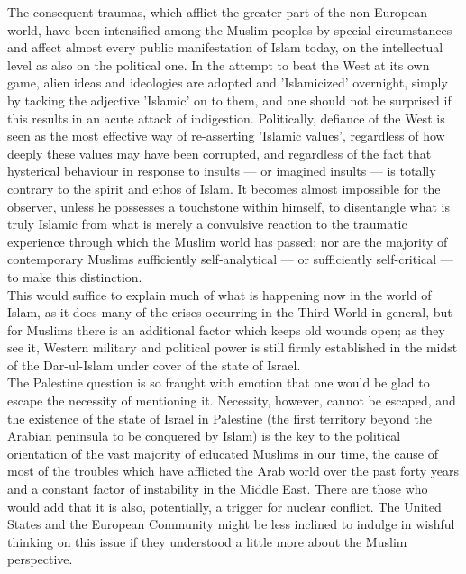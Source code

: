 \documentclass[10pt, twoside,openright]{book}
\begin{document}
The consequent traumas, which afflict the greater part of the non\hyp{}European world, have been intensified among the Muslim peoples by special circumstances and affect almost every public manifestation of Islam today, on the intellectual level as also on the political one. In the attempt to beat the West at its own game, alien ideas and ideologies are adopted and 'Islamicized' overnight, simply by tacking the adjective 'Islamic' on to them, and one should not be surprised if this results in an acute attack of indigestion. Politically, defiance of the West is seen as the most effective way of re-asserting 'Islamic values', regardless of how deeply these values may have been corrupted, and regardless of the fact that hysterical behaviour in response to insults --- or imagined insults --- is totally contrary to the spirit and ethos of Islam. It becomes almost impossible for the observer, unless he possesses a touchstone within himself, to disentangle what is truly Islamic from what is merely a convulsive reaction to the traumatic experience through which the Muslim world has passed; nor are the majority of contemporary Muslims sufficiently self\hyp{}analytical --- or sufficiently self\hyp{}critical --- to make this distinction. \\

This would suffice to explain much of what is happening now in the world of Islam, as it does many of the crises occurring in the Third World in general, but for Muslims there is an additional factor which keeps old wounds open; as they see it, Western military and political power is still firmly established in the midst of the Dar\hyp{}ul\hyp{}Islam under cover of the state of Israel. \\

The Palestine question is so fraught with emotion that one would be glad to escape the necessity of mentioning it. Necessity, however, cannot be escaped, and the existence of the state of Israel in Palestine (the first territory beyond the Arabian peninsula to be conquered by Islam) is the key to the political orientation of the vast majority of educated Muslims in our time, the cause of most of the troubles which have afflicted the Arab world over the past forty years and a constant factor of instability in the Middle East. There are those who would add that it is also, potentially, a trigger for nuclear conflict. The United States and the European Community might be less inclined to indulge in wishful thinking on this issue if they understood a little more about the Muslim perspective. \\
\end{document}
